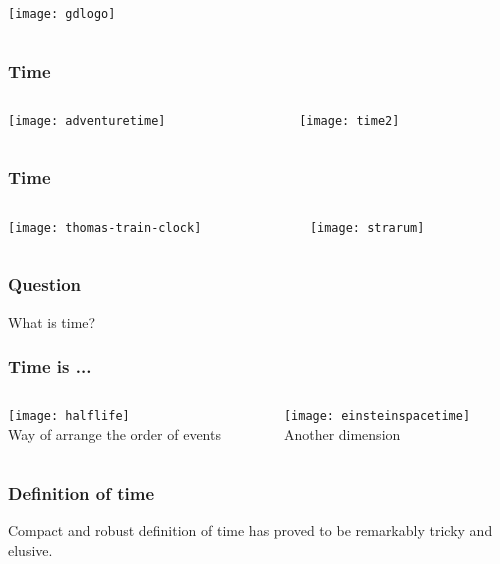 \documentclass[aspectratio=169, 15pt,usenames,dvipsnames]{beamer}
\begin{document}
{\begin{gdblank}
\begin{columns}
\begin{column}{0.5\textwidth}
				\centering\texttt{[image: gdlogo]}
			\end{column}
		\end{columns}        
	\end{gdblank}
	\begin{gdblank}
		\frametitle{Time} 
		\begin{columns}
			\begin{column}{0.5\textwidth}
				\centering\texttt{[image: adventuretime]} 
			\end{column}
			\pause 
			\begin{column}{0.5\textwidth}
				\centering\texttt{[image: time2]} 
			\end{column}
		\end{columns}            
	\end{gdblank}
	\begin{gdblank}
		\frametitle{Time}
		\begin{columns}
			\begin{column}{0.5\textwidth}
				\centering\texttt{[image: thomas-train-clock]} 
			\end{column}
			\pause 
			\begin{column}{0.5\textwidth}
				\centering\texttt{[image: strarum]} 
			\end{column}
		\end{columns}            
	\end{gdblank}
	\begin{gdblank}
		\frametitle{Question}
		\centering\Huge What is time?           
	\end{gdblank} 
	\begin{gdblank}
		\frametitle{Time is ...}
		\begin{columns}
			\begin{column}{0.5\textwidth}
				\centering\texttt{[image: halflife]} 
				\\Way of arrange the order of events 
			\end{column}
			\pause 
			\begin{column}{0.5\textwidth}
				\centering\texttt{[image: einsteinspacetime]} 
				\\Another dimension
			\end{column}
		\end{columns} 
	\end{gdblank} 
	\begin{gdblank}
		\frametitle{Definition of time}
		\LARGE Compact and robust definition of time has proved to be remarkably tricky and elusive.

\end{gdblank}}
\end{document}
